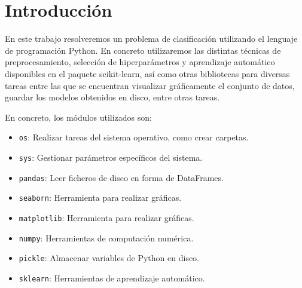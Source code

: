 \section{Introducción}

En este trabajo resolveremos un problema de clasificación utilizando el lenguaje de programación Python. En concreto utilizaremos las distintas técnicas de preprocesamiento, selección de hiperparámetros y aprendizaje automático disponibles en el paquete scikit-learn, así como otras bibliotecas para diversas tareas entre las que se encuentran visualizar gráficamente el conjunto de datos, guardar los modelos obtenidos en disco, entre otras tareas.

En concreto, los módulos utilizados son:

\begin{itemize}
	\item \texttt{os}: Realizar tareas del sistema operativo, como crear carpetas.
	\item \texttt{sys}: Gestionar parámetros específicos del sistema.
	\item \texttt{pandas}: Leer ficheros de disco en forma de DataFrames.
	\item \texttt{seaborn}: Herramienta para realizar gráficas.
	\item \texttt{matplotlib}: Herramienta para realizar gráficas.
	\item \texttt{numpy}: Herramientas de computación numérica.
	\item \texttt{pickle}: Almacenar variables de Python en disco.
	\item \texttt{sklearn}: Herramientas de aprendizaje automático.
\end{itemize}

\newpage
